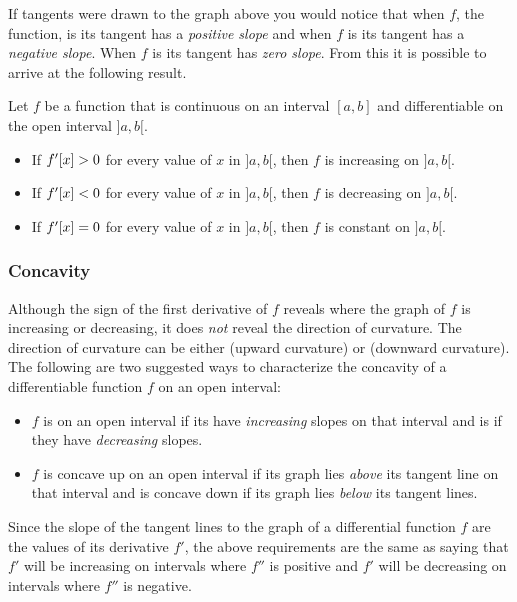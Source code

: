 If tangents were drawn to the graph above you would notice that when $f$, the function, is  its tangent has a \emph{positive slope} and when $f$ is  its tangent has a \emph{negative slope}. When $f$ is  its tangent has \emph{zero slope}. From this it is possible to arrive at the following result.

\begin{note}
Let $f$ be a function that is continuous on an interval $[a,b]$ and differentiable on the open interval $]a, b[$.
\end{note}

\begin{itemize}
\item If $f'\!\left[{x}\right] > 0$ for every value of $x$ in $]a,b[$, then $f$ is increasing on $]a,b[$.
%
\item If $f'\!\left[{x}\right] < 0$ for every value of $x$ in $]a,b[$, then $f$ is decreasing on $]a,b[$. 
%
\item If $f'\!\left[{x}\right] = 0$ for every value of $x$ in $]a,b[$, then $f$ is constant on $]a,b[$.
%
\end{itemize}


\subsubsection{Concavity} 
Although the sign of the first derivative of $f$ reveals where the graph of $f$ is increasing or decreasing, it does \emph{not} reveal the direction of curvature. The direction of curvature can be either  (upward curvature) or  (downward curvature). The following are two suggested ways to characterize the concavity of a differentiable function $f$ on an open interval:
\begin{itemize}
\item $f$ is  on an open interval if its  have \emph{increasing} slopes on that interval and is  if they have \emph{decreasing} slopes.
%
\item $f$ is concave up on an open interval if its graph lies \emph{above} its tangent line on that interval and is concave down if its graph lies \emph{below} its tangent lines.
\end{itemize}

Since the slope of the tangent lines to the graph of a differential function $f$ are the values of its derivative $f'$, the above requirements are the same as saying that $f'$ will be increasing on intervals where $f''$ is positive and $f'$ will be decreasing on intervals where $f''$ is negative.

